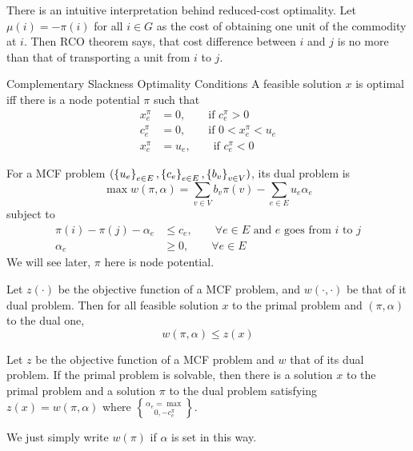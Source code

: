 \documentclass[UTF8,a4paper]{ctexart}
\begin{document}
There is an intuitive interpretation behind reduced-cost optimality.
Let $\mu(i)=-\pi(i)$ for all $i\in G$ as the cost of obtaining one unit of the commodity at $i$.
Then RCO theorem says, that cost difference between $i$ and $j$ is no more than that of transporting a unit from $i$ to $j$.

\begin{theorem}{Complementary Slackness Optimality Conditions}
    A feasible solution $x$ is optimal iff
    there is a node potential $\pi$ such that
    \begin{align}
        x^\pi_e &=0, \qquad\text{if }c^\pi_e > 0\\
        c^\pi_e &=0, \qquad\text{if }0 < x^\pi_e < u_e\\
        x^\pi_e &=u_e, \qquad\text{if }c^\pi_e < 0
    \end{align}
\end{theorem}

\begin{definition}
    For a MCF problem $(\brace{u_e}_{e\in E}, \brace{c_e}_{e\in E}, \brace{b_v}_{v\in V})$,
    its dual problem is
    \[
        \max w(\pi, \alpha)=\sum_{v\in V}b_v\pi(v) - \sum_{e\in E}u_e\alpha_e
    \]
    subject to
    \begin{align}
        \pi(i) - \pi(j) - \alpha_e &\leq c_e, \qquad\forall e\in E\text{ and $e$ goes from $i$ to $j$}\\
        \alpha_e&\geq 0, \qquad\forall e\in E
    \end{align}
    We will see later, $\pi$ here is node potential.
\end{definition}

\begin{theorem}
    Let $z(\cdot)$ be the objective function of a MCF problem, and $w(\cdot, \cdot)$ be that of it dual problem.
    Then for all feasible solution $x$ to the primal problem and $(\pi, \alpha)$ to the dual one,
    \[
        w(\pi,\alpha)\leq z(x)
    \]
\end{theorem}

\begin{theorem}
    Let $z$ be the objective function of a MCF problem and $w$ that of its dual problem.
    If the primal problem is solvable,
    then there is a solution $x$ to the primal problem and a solution $\pi$ to the dual problem satisfying
    $z(x)=w(\pi, \alpha)$ where $\alpha_e = \max\brace{0, -c^\pi_e}$.

    We just simply write $w(\pi)$ if $\alpha$ is set in this way.
\end{theorem}
\end{document}

